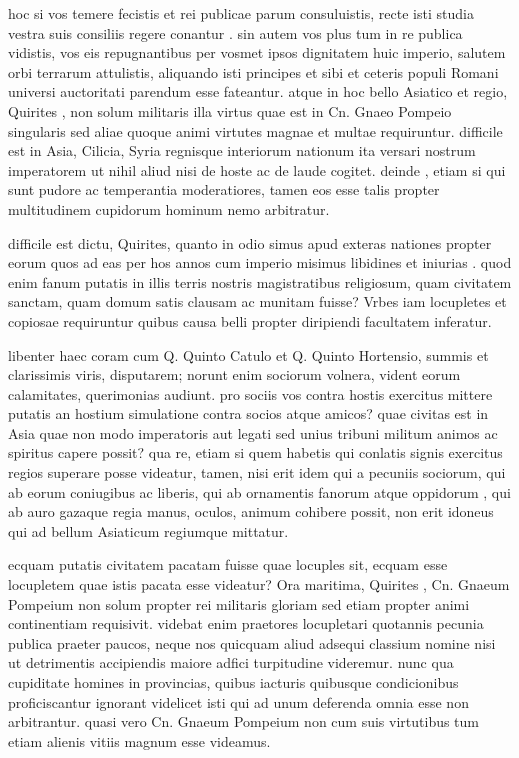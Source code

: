 hoc si vos temere fecistis et rei publicae parum consuluistis, recte isti studia vestra suis consiliis regere conantur . sin autem vos plus tum in re publica vidistis, vos eis repugnantibus per vosmet ipsos dignitatem huic imperio, salutem orbi terrarum attulistis, aliquando isti principes et sibi et ceteris populi Romani universi auctoritati parendum esse fateantur. atque in hoc bello Asiatico et regio, Quirites , non solum militaris illa virtus quae est in Cn. Gnaeo Pompeio singularis sed aliae quoque animi virtutes magnae et multae requiruntur. difficile est in Asia, Cilicia, Syria regnisque interiorum nationum ita versari nostrum imperatorem ut nihil aliud nisi de hoste ac de laude cogitet. deinde , etiam si qui sunt pudore ac temperantia moderatiores, tamen eos esse talis propter multitudinem cupidorum hominum nemo arbitratur.

 difficile est dictu, Quirites, quanto in odio simus apud exteras nationes propter eorum quos ad eas per hos annos cum imperio misimus libidines et iniurias . quod enim fanum putatis in illis terris nostris magistratibus religiosum, quam civitatem sanctam, quam domum satis clausam ac munitam fuisse? Vrbes iam locupletes et copiosae requiruntur quibus causa belli propter diripiendi facultatem inferatur.

 libenter haec coram cum Q. Quinto Catulo et Q. Quinto Hortensio, summis et clarissimis viris, disputarem; norunt enim sociorum volnera, vident eorum calamitates, querimonias audiunt. pro sociis vos contra hostis exercitus mittere putatis an hostium simulatione contra socios atque amicos? quae civitas est in Asia quae non modo imperatoris aut legati sed unius tribuni militum animos ac spiritus capere possit? qua re, etiam si quem habetis qui conlatis signis exercitus regios superare posse videatur, tamen, nisi erit idem qui a pecuniis sociorum, qui ab eorum coniugibus ac liberis, qui ab ornamentis fanorum atque oppidorum , qui ab auro gazaque regia manus, oculos, animum cohibere possit, non erit idoneus qui ad bellum Asiaticum regiumque mittatur.

 ecquam putatis civitatem pacatam fuisse quae locuples sit, ecquam esse locupletem quae istis pacata esse videatur? Ora maritima, Quirites , Cn. Gnaeum Pompeium non solum propter rei militaris gloriam sed etiam propter animi continentiam requisivit. videbat enim praetores locupletari quotannis pecunia publica praeter paucos, neque nos quicquam aliud adsequi classium nomine nisi ut detrimentis accipiendis maiore adfici turpitudine videremur. nunc qua cupiditate homines in provincias, quibus iacturis quibusque condicionibus proficiscantur ignorant videlicet isti qui ad unum deferenda omnia esse non arbitrantur. quasi vero Cn. Gnaeum Pompeium non cum suis virtutibus tum etiam alienis vitiis magnum esse videamus.

